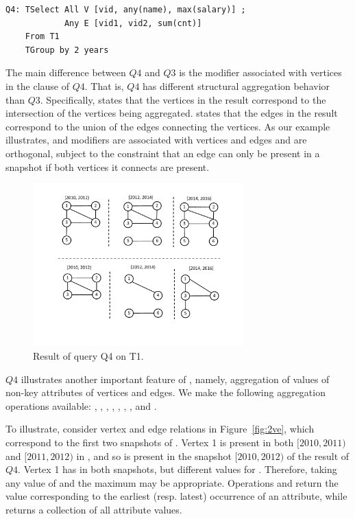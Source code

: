 \begin{verbatim}
Q4: TSelect All V [vid, any(name), max(salary)] ; 
            Any E [vid1, vid2, sum(cnt)] 
    From T1 
    TGroup by 2 years
\end{verbatim}

The main difference between $Q4$ and $Q3$ is the  modifier
associated with vertices in the  clause of $Q4$.  That
is, $Q4$ has different structural aggregation behavior than $Q3$.
Specifically,  states that the vertices in the result
correspond to the intersection of the vertices being aggregated.
 states that the edges in the result correspond to the
union of the edges connecting the vertices.  As our example
illustrates,  and  modifiers are associated with
vertices and edges and are orthogonal, subject to the constraint that
an edge can only be present in a snapshot if both vertices it connects
are present.

\begin{figure}
\includegraphics[width=3.2in]{figs/TGroupAllAny.pdf}
\caption{Result of query Q4 on T1.}
\label{fig:tg_all_any}
\end{figure}

$Q4$ illustrates another important feature of \ql, namely, aggregation
of values of non-key attributes of vertices and edges.  We make the
following aggregation operations available: ,
, , , , ,
, and .

To illustrate, consider vertex and edge relations in
Figure~\ref{fig:2ve}, which correspond to the first two snapshots of
.  Vertex 1 is present in both $[2010, 2011)$ and $[2011,
    2012)$ in , and so is present in the snapshot $[2010,
      2012)$ of the result of $Q4$.  Vertex 1 has 
      in both snapshots, but different values for .
      Therefore, taking any value of  and the maximum
       may be appropriate.  Operations  and
       return the value corresponding to the earliest
      (resp. latest) occurrence of an attribute, while 
      returns a collection of all attribute values.

